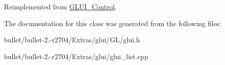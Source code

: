 Reimplemented from \hyperlink{class_g_l_u_i___control}{G\+L\+U\+I\+\_\+\+Control}.



The documentation for this class was generated from the following files\+:\begin{DoxyCompactItemize}
\item 
bullet/bullet-\/2.-\/r2704/\+Extras/glui/\+G\+L/glui.\+h\item 
bullet/bullet-\/2.-\/r2704/\+Extras/glui/glui\+\_\+list.\+cpp\end{DoxyCompactItemize}

